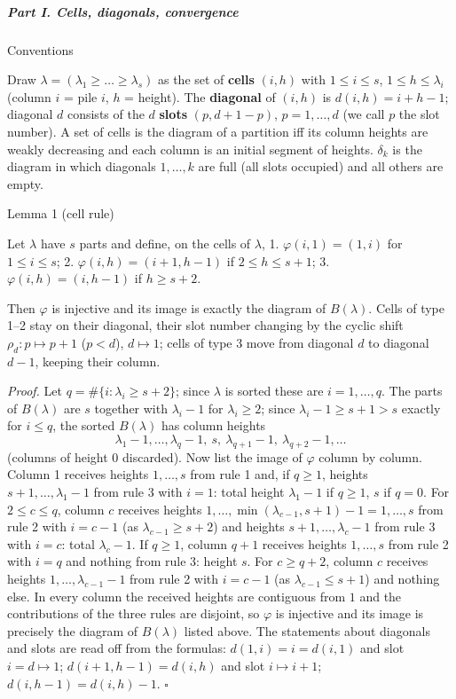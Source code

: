 \documentclass[11pt,a4paper]{article}
\begin{document}
\subparagraph{Part I. Cells, diagonals,
convergence}\label{part-i.-cells-diagonals-convergence}

Conventions

Draw \(\lambda=(\lambda_1\ge\dots\ge\lambda_s)\) as the set of
\textbf{cells} \((i,h)\) with \(1\le i\le s\), \(1\le h\le\lambda_i\)
(column \(i\) = pile \(i\), \(h\) = height). The \textbf{diagonal} of
\((i,h)\) is \(d(i,h)=i+h-1\); diagonal \(d\) consists of the \(d\)
\textbf{slots} \((p,d+1-p)\), \(p=1,\dots,d\) (we call \(p\) the slot
number). A set of cells is the diagram of a partition iff its column
heights are weakly decreasing and each column is an initial segment of
heights. \(\delta_k\) is the diagram in which diagonals \(1,\dots,k\)
are full (all slots occupied) and all others are empty.

Lemma 1 (cell rule)

Let \(\lambda\) have \(s\) parts and define, on the cells of
\(\lambda\), 1. \(\varphi(i,1)=(1,i)\) for \(1\le i\le s\); 2.
\(\varphi(i,h)=(i+1,h-1)\) if \(2\le h\le s+1\); 3.
\(\varphi(i,h)=(i,h-1)\) if \(h\ge s+2\).

Then \(\varphi\) is injective and its image is exactly the diagram of
\(B(\lambda)\). Cells of type 1--2 stay on their diagonal, their slot
number changing by the cyclic shift \(\rho_d:p\mapsto p+1\) (\(p<d\)),
\(d\mapsto 1\); cells of type 3 move from diagonal \(d\) to diagonal
\(d-1\), keeping their column.

\emph{Proof.} Let \(q=\#\{i:\lambda_i\ge s+2\}\); since \(\lambda\) is
sorted these are \(i=1,\dots,q\). The parts of \(B(\lambda)\) are \(s\)
together with \(\lambda_i-1\) for \(\lambda_i\ge 2\); since
\(\lambda_i-1\ge s+1>s\) exactly for \(i\le q\), the sorted
\(B(\lambda)\) has column heights
\[\lambda_1-1,\dots,\lambda_q-1,\ s,\ \lambda_{q+1}-1,\ \lambda_{q+2}-1,\dots\]
(columns of height \(0\) discarded). Now list the image of \(\varphi\)
column by column. Column 1 receives heights \(1,\dots,s\) from rule 1
and, if \(q\ge1\), heights \(s+1,\dots,\lambda_1-1\) from rule 3 with
\(i=1\): total height \(\lambda_1-1\) if \(q\ge1\), \(s\) if \(q=0\).
For \(2\le c\le q\), column \(c\) receives heights
\(1,\dots,\min(\lambda_{c-1},s+1)-1=1,\dots,s\) from rule 2 with
\(i=c-1\) (as \(\lambda_{c-1}\ge s+2\)) and heights
\(s+1,\dots,\lambda_c-1\) from rule 3 with \(i=c\): total
\(\lambda_c-1\). If \(q\ge1\), column \(q+1\) receives heights
\(1,\dots,s\) from rule 2 with \(i=q\) and nothing from rule 3: height
\(s\). For \(c\ge q+2\), column \(c\) receives heights
\(1,\dots,\lambda_{c-1}-1\) from rule 2 with \(i=c-1\) (as
\(\lambda_{c-1}\le s+1\)) and nothing else. In every column the received
heights are contiguous from \(1\) and the contributions of the three
rules are disjoint, so \(\varphi\) is injective and its image is
precisely the diagram of \(B(\lambda)\) listed above. The statements
about diagonals and slots are read off from the formulas:
\(d(1,i)=i=d(i,1)\) and slot \(i=d\mapsto 1\); \(d(i+1,h-1)=d(i,h)\) and
slot \(i\mapsto i+1\); \(d(i,h-1)=d(i,h)-1\). \(\square\)
\end{document}
